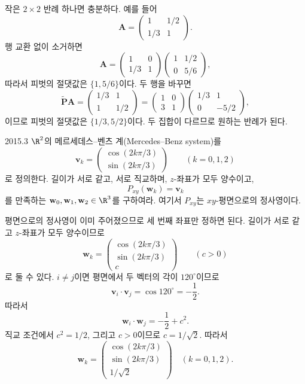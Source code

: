 \begin{solution}
작은 $2\times2$ 반례 하나면 충분하다. 예를 들어
\[
\mathbf A=
\begin{pmatrix}
1&1/2\\[2pt]
1/3&1
\end{pmatrix}.
\]
행 교환 없이 소거하면
\[
\mathbf A=
\begin{pmatrix}1&0\\1/3&1\end{pmatrix}
\begin{pmatrix}1&1/2\\0&5/6\end{pmatrix},
\]
따라서 피벗의 절댓값은 $\{1,5/6\}$이다. 두 행을 바꾸면
\[
\widetilde{\mathbf P}\mathbf A=
\begin{pmatrix}1/3&1\\1&1/2\end{pmatrix}
=
\begin{pmatrix}1&0\\3&1\end{pmatrix}
\begin{pmatrix}1/3&1\\0&-5/2\end{pmatrix},
\]
이므로 피벗의 절댓값은 $\{1/3,5/2\}$이다. 두 집합이 다르므로 원하는 반례가 된다.
\end{solution}

\begin{pastproblem}{2015.3}
$\R^2$의 메르세데스--벤츠 계(Mercedes--Benz system)를
\[
\mathbf v_k=
\begin{pmatrix}
\cos(2k\pi/3)\\
\sin(2k\pi/3)
\end{pmatrix}
\qquad(k=0,1,2)
\]
로 정의한다. 길이가 서로 같고, 서로 직교하며, $z$-좌표가 모두 양수이고,
\[
P_{xy}(\mathbf w_k)=\mathbf v_k
\]
를 만족하는 $\mathbf w_0,\mathbf w_1,\mathbf w_2\in\R^3$를 구하여라. 여기서 $P_{xy}$는 $xy$-평면으로의 정사영이다.
\end{pastproblem}

\begin{solution}
평면으로의 정사영이 이미 주어졌으므로 세 번째 좌표만 정하면 된다. 길이가 서로 같고 $z$-좌표가 모두 양수이므로
\[
\mathbf w_k=
\begin{pmatrix}
\cos(2k\pi/3)\\
\sin(2k\pi/3)\\
c
\end{pmatrix}
\qquad(c>0)
\]
로 둘 수 있다. $i\ne j$이면 평면에서 두 벡터의 각이 $120^\circ$이므로
\[
\mathbf v_i\cdot\mathbf v_j=\cos120^\circ=-\frac12.
\]
따라서
\[
\mathbf w_i\cdot\mathbf w_j=-\frac12+c^2.
\]
직교 조건에서 $c^2=1/2$, 그리고 $c>0$이므로 $c=1/\sqrt2$. 따라서
\[
\boxed{
\mathbf w_k=
\begin{pmatrix}
\cos(2k\pi/3)\\
\sin(2k\pi/3)\\
1/\sqrt2
\end{pmatrix}
\quad(k=0,1,2)}.
\]
\end{solution}

